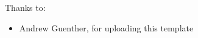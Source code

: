 \noindent
Thanks to:
\begin{itemize}
    \item Andrew Guenther, for uploading this template
\end{itemize}

